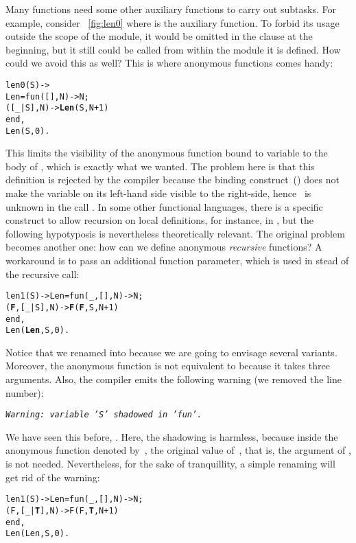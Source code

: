 Many functions need some other auxiliary functions to carry out
subtasks. For example, consider \fig~\vref{fig:len0} where
 is the auxiliary function. To forbid its usage
outside the scope of the module, it would be omitted in the
 clause at the beginning, but it still could be
called from within the module it is defined. How could we avoid this
as well? This is where anonymous functions comes handy:
\begin{alltt}
len0(S) ->
  Len = fun(   [],N) -> N;
           ([\_|S],N) -> \textbf{Len}(S,N+1)\hfill% \emph{Does not compile}
        end,
  Len(S,0).
\end{alltt}
This limits the visibility of the anonymous function bound to variable
 to the body of , which is exactly what
we wanted. The problem here is that this definition is rejected by the
\Erlang compiler because the binding construct~(\erlcode{=}) does not
make the variable on its left\hyp{}hand side visible to the
right\hyp{}side, hence ~is unknown in the call
. In some other functional languages, there is a
specific construct to allow recursion on local definitions, for
instance,  in \OCaml, but the following hypotyposis
is nevertheless theoretically relevant. The original problem becomes
another one: how can we define anonymous \emph{recursive} functions? A
workaround is to pass an additional function parameter, which is used
in stead of the recursive call:
\begin{alltt}
len1(S) -> Len = fun(\_,   [],N) -> N;
                    (\textbf{F},[\_|S],N) -> \textbf{F}(\textbf{F},S,N+1)
                 end,
           Len(\textbf{Len},S,0).
\end{alltt}
Notice that we renamed  into 
because we are going to envisage several variants. Moreover, the
anonymous function is not equivalent to  because it
takes three arguments. Also, the compiler emits the following warning
(we removed the line number):
\begin{center}
\emph{\texttt{Warning: variable 'S' shadowed in 'fun'.}}
\end{center}
We have seen this before, . Here, the shadowing is
harmless, because inside the anonymous function denoted
by~, the original value of~, that is, the
argument of , is not needed. Nevertheless, for the
sake of tranquillity, a simple renaming will get rid of the warning:
\begin{alltt}
len1(S) -> Len = fun(\_,   [],N) -> N;
                    (F,[\_|\textbf{T}],N) -> F(F,\textbf{T},N+1)\hfill% \emph{Renaming}
                 end,
           Len(Len,S,0).
\end{alltt}
